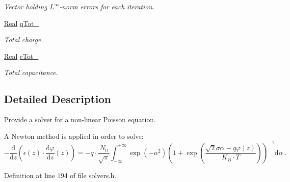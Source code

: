 \begin{DoxyCompactItemize}
\begin{DoxyCompactList}\small\item\em Vector holding $ L^\infty $-\/norm errors for each iteration. \end{DoxyCompactList}\item 
\hypertarget{classNonLinearPoisson1D_a5fa713b8efdf7b2651478e560ae70074}{\hyperlink{typedefs_8h_a060b837c3b4486ee35317744156f3da2}{Real} \hyperlink{classNonLinearPoisson1D_a5fa713b8efdf7b2651478e560ae70074}{q\-Tot\-\_\-}}\label{classNonLinearPoisson1D_a5fa713b8efdf7b2651478e560ae70074}

\begin{DoxyCompactList}\small\item\em Total charge. \end{DoxyCompactList}\item 
\hypertarget{classNonLinearPoisson1D_a4edec5e6395e5a862df829a223323533}{\hyperlink{typedefs_8h_a060b837c3b4486ee35317744156f3da2}{Real} \hyperlink{classNonLinearPoisson1D_a4edec5e6395e5a862df829a223323533}{c\-Tot\-\_\-}}\label{classNonLinearPoisson1D_a4edec5e6395e5a862df829a223323533}

\begin{DoxyCompactList}\small\item\em Total capacitance. \end{DoxyCompactList}\end{DoxyCompactItemize}


\subsection{Detailed Description}
Provide a solver for a non-\/linear Poisson equation. 

A Newton method is applied in order to solve\-: \[ -\frac{\mathrm{d}}{\mathrm{d}z} \left(\epsilon(z) \cdot \frac{\mathrm{d}\varphi}{\mathrm{d}z}(z) \right) = - q \cdot \frac{N_0}{\sqrt{\pi}} \int_{-\infty}^{+\infty} \exp\left(-\alpha^2\right) \left( 1 + \exp\left( \frac{\sqrt{2}\sigma\alpha - q\varphi(z)}{K_B \cdot T} \right) \right)^{-1} \mathrm{d}\alpha ~ . \] 

Definition at line 194 of file solvers.\-h.



